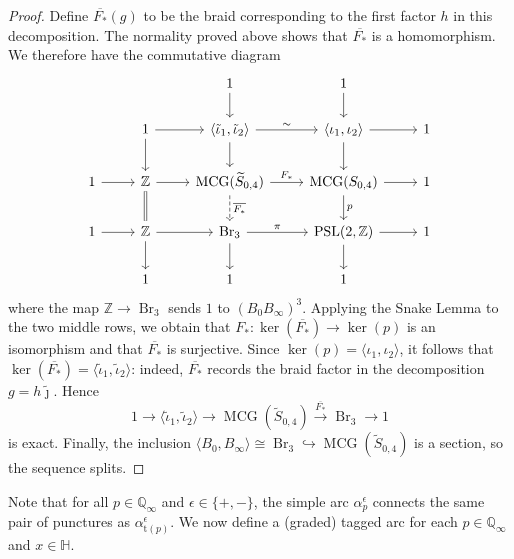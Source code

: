 \documentclass[11pt,a4paper,reqno]{amsart}%
\theoremstyle{plain}
\theoremstyle{definition}
\numberwithin{equation}{section}
\numberwithin{equation}{section}
\def\<{\langle}
\def\>{\rangle}
\def\ZZ{\mathbb{Z}}
\newcommand{\QQi}{\mathbb{Q}_\infty}
\newcommand{\MCG}{\operatorname{MCG}}
\def\Br{\operatorname{Br}}
\def\PSL{\operatorname{PSL}}
\newcommand{\typ}[1]{\mathrm{t}(#1)}%
\newcommand{\bfH}{\mathbb{H}}
\begin{document}
\begin{proof}
Define $\overline{F_*}(g)$ to be the braid corresponding to the first factor
$h$ in this decomposition. The normality proved above shows that
$\overline{F_*}$ is a homomorphism. We therefore have the commutative diagram
\[
\begin{tikzcd}
            &                                & 1 \arrow[d]                                         & 1 \arrow[d]                               &   \\
            & 1 \arrow[r] \arrow[d]          & {\langle\tilde\iota_1,\tilde\iota_2\rangle} \arrow[r,"\sim"] \arrow[d]           & {\<\iota_1,\iota_2\>} \arrow[r] \arrow[d] & 1 \\
1 \arrow[r] & \mathbb{Z} \arrow[r] \arrow[d,equal] & \MCG(\widetilde{S}_{0,4}) \arrow[r,"F_*"] \arrow[d,"\overline{F_*}", dashed] & \MCG(S_{0,4}) \arrow[r] \arrow[d,"p"]           & 1 \\
1 \arrow[r] & \mathbb{Z} \arrow[r] \arrow[d] & \Br_3 \arrow[r,"\pi"] \arrow[d]                            & {\PSL(2,\ZZ)} \arrow[r] \arrow[d]  & 1 \\
            & 1                              & 1                                                   & 1                                         &  
\end{tikzcd}
\]
where the map $\mathbb Z\to\Br_3$ sends $1$ to
$(B_0B_\infty)^3$. Applying the Snake Lemma to the two middle rows,
we obtain that $F_*:\ker(\overline{F_*})\to\ker(p)$ is an isomorphism and that
$\overline{F_*}$ is surjective. Since
$\ker(p)=\<\iota_1,\iota_2\>$, it follows that
$\ker(\overline{F_*})=\langle\tilde\iota_1,\tilde\iota_2\rangle$:
indeed, $\overline{F_*}$ records the braid factor in the decomposition
$g=h\widetilde\jmath$. Hence
\[
1\to \langle\tilde\iota_1,\tilde\iota_2\rangle
\to \MCG(\widetilde{S}_{0,4})\xrightarrow{\overline{F_*}}\Br_3\to1
\]
is exact. Finally, the inclusion
$\langle B_0,B_\infty\rangle\cong\Br_3\hookrightarrow\MCG(\widetilde{S}_{0,4})$
is a section, so the sequence splits.
\end{proof}


   Note that for all  $p\in\QQi$ and  $\epsilon \in \{+, -\}$, the simple arc $\alpha_p^\epsilon$   connects the same pair of punctures as  $\alpha_{\typ{p}}^\epsilon$.
We now define a (graded) tagged arc for each $p\in\QQi$ and $x \in\bfH$.
\end{document}
